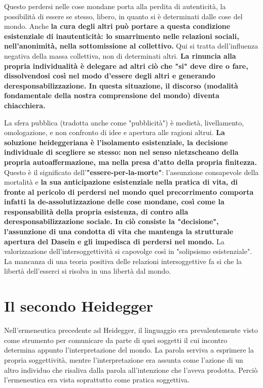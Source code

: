 Questo perdersi nelle cose mondane porta alla perdita di
autenticità, la possibilità di essere se stesso, libero,
in quanto si è determinati dalle cose del mondo.
Anche \textbf{la cura degli altri può portare a questa
condizione esistenziale di inautenticità: lo
smarrimento nelle relazioni sociali, nell'anonimità,
nella sottomissione al collettivo.} Qui si tratta
dell'influenza negativa della massa collettiva,
non di determinati altri. \textbf{La rinuncia alla
propria individualità è delegare ad altri ciò
che "si" deve dire o fare, dissolvendosi così nel
modo d'essere degli altri e generando
deresponsabilizzazione. In questa situazione,
il discorso (modalità fondamentale della nostra
comprensione del mondo) diventa chiacchiera.}

La sfera pubblica (tradotta anche come "pubblicità") è
medietà, livellamento, omologazione, e non confronto
di idee e apertura alle ragioni altrui.
\textbf{La soluzione heideggeriana è l'isolamento
esistenziale, la decisione individuale di
scegliere se stesso: non nel senso nietzscheano
della propria autoaffermazione, ma nella presa
d'atto della propria finitezza.} Questo è il
significato dell'\textbf{"essere-per-la-morte"}: l'assunzione
consapevole della mortalità e \textbf{la sua anticipazione
esistenziale nella pratica di vita, di fronte al
pericolo di perdersi nel mondo quel precorrimento
comporta infatti la de-assolutizzazione delle cose
mondane, così come la responsabilità della propria
esistenza, di contro alla deresponsabilizzazione
sociale. In ciò consiste la "decisione", l'assunzione di una condotta di vita che mantenga
la strutturale apertura del Dasein e gli impedisca
di perdersi nel mondo.} La valorizzazione dell'intersoggettività si capovolge così in
"solipsismo esistenziale". La mancanza di una
teoria positiva delle relazioni intersoggettive
fa si che la libertà dell'esserci si risolva in
una libertà dal mondo.

\section{Il secondo Heidegger}

Nell'ermeneutica precedente ad Heidegger, il linguaggio era
prevalentemente visto come strumento per
comunicare da parte di quei soggetti il cui incontro
determina appunto l'interpretazione del mondo. La
parola serviva a esprimere la propria soggettività, mentre
l'interpretazione era assunta come l'azione di un altro
individuo che risaliva dalla parola all'intenzione che
l'aveva prodotta. Perciò l'ermeneutica era vista soprattutto
come pratica soggettiva.

